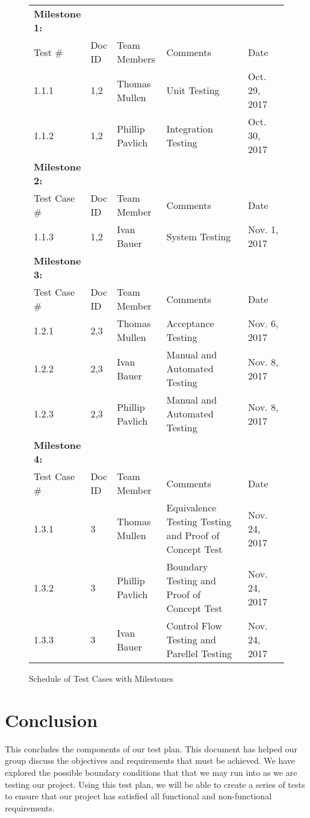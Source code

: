 \documentclass[12pt]{article}
\begin{document}
\begin{figure}
\caption{Schedule of Test Cases with Milestones}
\label{casedates}
\begin{tabular}{| p{0.15\linewidth} | p{0.05\linewidth} | p{0.2\linewidth} | p{0.4\linewidth} | p{0.2\linewidth} |}
	\hline
	\textbf{Milestone 1:} & & & & \\
	Test \# & Doc ID & Team Members & Comments & Date \\
	\hline
	1.1.1  & 1,2 & Thomas Mullen & Unit Testing & Oct. 29, 2017 \\
	1.1.2 & 1,2 & Phillip Pavlich & Integration Testing & Oct. 30, 2017 \\
	\hline
	\hline
	\textbf{Milestone 2:} & & & & \\
	Test Case \# & Doc ID & Team Member & Comments & Date \\
	\hline
	1.1.3 & 1,2 & Ivan Bauer & System Testing & Nov. 1, 2017 \\
	\hline
	\hline
	\textbf{Milestone 3:} & & & & \\
	Test Case \# & Doc ID & Team Member & Comments & Date \\
	\hline
	1.2.1 & 2,3 & Thomas Mullen & Acceptance Testing & Nov. 6, 2017 \\
	1.2.2 & 2,3 & Ivan Bauer & Manual and Automated Testing & Nov. 8, 2017 \\
	1.2.3 & 2,3 & Phillip Pavlich & Manual and Automated Testing & Nov. 8, 2017 \\
	\hline
	\hline
	\textbf{Milestone 4:} & & & & \\
	Test Case \# & Doc ID & Team Member & Comments & Date \\
	\hline
	1.3.1 & 3 & Thomas Mullen & Equivalence Testing Testing and Proof of Concept Test & Nov. 24, 2017 \\
	1.3.2 & 3 & Phillip Pavlich & Boundary Testing and Proof of Concept Test & Nov. 24, 2017 \\
	1.3.3 & 3 & Ivan Bauer & Control Flow Testing and Parellel Testing & Nov. 24, 2017 \\
	\hline
\end{tabular}
\end{figure}

\clearpage

\section{Conclusion}
This concludes the components of our test plan. This document has helped our group discuss the objectives and requirements that must be achieved. We have explored the possible boundary conditions that that we may run into as we are testing our project. Using this test plan, we will be able to create a series of tests to ensure that our project has satisfied all functional and non-functional requirements.
\end{document}
